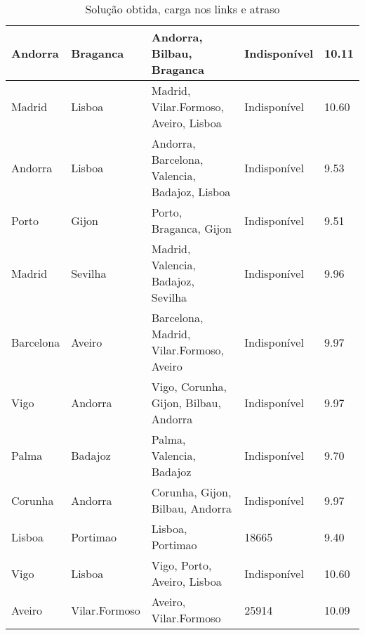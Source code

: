 \begin{table}[!htb]
{\begin{tabular}{|l|l|l|l|l|}
Andorra & Braganca & Andorra, Bilbau, Braganca & Indisponível & 10.11 \\ \hline
Madrid & Lisboa & Madrid, Vilar.Formoso, Aveiro, Lisboa & Indisponível & 10.60 \\ \hline
Andorra & Lisboa & Andorra, Barcelona, Valencia, Badajoz, Lisboa & Indisponível & 9.53 \\ \hline
Porto & Gijon & Porto, Braganca, Gijon & Indisponível & 9.51 \\ \hline
Madrid & Sevilha & Madrid, Valencia, Badajoz, Sevilha & Indisponível & 9.96 \\ \hline
Barcelona & Aveiro & Barcelona, Madrid, Vilar.Formoso, Aveiro & Indisponível & 9.97 \\ \hline
Vigo & Andorra & Vigo, Corunha, Gijon, Bilbau, Andorra & Indisponível & 9.97 \\ \hline
Palma & Badajoz & Palma, Valencia, Badajoz & Indisponível & 9.70 \\ \hline
Corunha & Andorra & Corunha, Gijon, Bilbau, Andorra & Indisponível & 9.97 \\ \hline
Lisboa & Portimao & Lisboa, Portimao & 18665 & 9.40 \\ \hline
Vigo & Lisboa & Vigo, Porto, Aveiro, Lisboa & Indisponível & 10.60 \\ \hline
Aveiro & Vilar.Formoso & Aveiro, Vilar.Formoso & 25914 & 10.09 \\ \hline
\end{tabular}}
\caption[]{Solução obtida, carga nos links e atraso}
\end{table}

